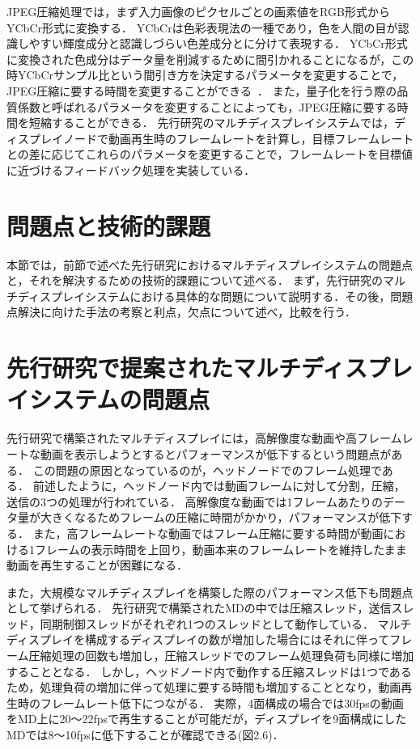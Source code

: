 JPEG圧縮処理では，まず入力画像のピクセルごとの画素値をRGB形式からYCbCr形式に変換する．
YCbCrは色彩表現法の一種であり，色を人間の目が認識しやすい輝度成分と認識しづらい色差成分とに分けて表現する\cite{YCbCr}．
YCbCr形式に変換された色成分はデータ量を削減するために間引かれることになるが，この時YCbCrサンプル比という間引き方を決定するパラメータを変更することで，
JPEG圧縮に要する時間を変更することができる~\cite{jpeg2}．
また，量子化を行う際の品質係数と呼ばれるパラメータを変更することによっても，JPEG圧縮に要する時間を短縮することができる．
先行研究のマルチディスプレイシステムでは，ディスプレイノードで動画再生時のフレームレートを計算し，目標フレームレートとの差に応じてこれらのパラメータを変更することで，フレームレートを目標値に近づけるフィードバック処理を実装している．





\section*{問題点と技術的課題}

本節では，前節で述べた先行研究におけるマルチディスプレイシステムの問題点と，それを解決するための技術的課題について述べる．
まず，先行研究のマルチディスプレイシステムにおける具体的な問題について説明する．その後，問題点解決に向けた手法の考察と利点，欠点について述べ，比較を行う．

\section*{先行研究で提案されたマルチディスプレイシステムの問題点}
先行研究で構築されたマルチディスプレイには，高解像度な動画や高フレームレートな動画を表示しようとするとパフォーマンスが低下するという問題点がある．
この問題の原因となっているのが，ヘッドノードでのフレーム処理である．
前述したように，ヘッドノード内では動画フレームに対して分割，圧縮，送信の3つの処理が行われている．
高解像度な動画では1フレームあたりのデータ量が大きくなるためフレームの圧縮に時間がかかり，パフォーマンスが低下する．
また，高フレームレートな動画ではフレーム圧縮に要する時間が動画における1フレームの表示時間を上回り，動画本来のフレームレートを維持したまま動画を再生することが困難になる．

また，大規模なマルチディスプレイを構築した際のパフォーマンス低下も問題点として挙げられる．
先行研究で構築されたMDの中では圧縮スレッド，送信スレッド，同期制御スレッドがそれぞれ1つのスレッドとして動作している．
マルチディスプレイを構成するディスプレイの数が増加した場合にはそれに伴ってフレーム圧縮処理の回数も増加し，圧縮スレッドでのフレーム処理負荷も同様に増加することとなる．
しかし，ヘッドノード内で動作する圧縮スレッドは1つであるため，処理負荷の増加に伴って処理に要する時間も増加することとなり，動画再生時のフレームレート低下につながる．
実際，4面構成の場合では30fpsの動画をMD上に20〜22fpsで再生することが可能だが，ディスプレイを9面構成にしたMDでは8〜10fpsに低下することが確認できる(図2.6)．

